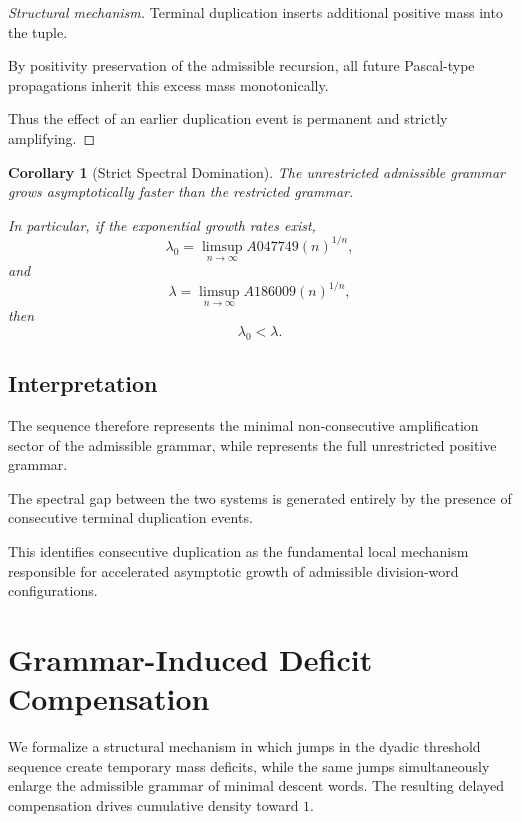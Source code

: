 \documentclass[12pt, oneside]{article}
\numberwithin{equation}{section}
\theoremstyle{definition}
\theoremstyle{plain}
\newtheorem{corollary}[theorem]{Corollary}
\theoremstyle{remark}
\begin{document}
\begin{proof}[Structural mechanism]
Terminal duplication inserts additional positive mass into the tuple.

By positivity preservation of the admissible recursion, all future
Pascal-type propagations inherit this excess mass monotonically.

Thus the effect of an earlier duplication event is permanent and
strictly amplifying.
\end{proof}

\begin{corollary}[Strict Spectral Domination]
The unrestricted admissible grammar grows asymptotically faster than the
restricted grammar.

In particular, if the exponential growth rates exist,
\[
\lambda_0
=
\limsup_{n\to\infty} A047749(n)^{1/n},
\]
and
\[
\lambda
=
\limsup_{n\to\infty} A186009(n)^{1/n},
\]
then
\[
\lambda_0 < \lambda.
\]
\end{corollary}

\subsection{Interpretation}

The sequence  therefore represents the minimal
non-consecutive amplification sector of the admissible grammar, while
 represents the full unrestricted positive grammar.

The spectral gap between the two systems is generated entirely by the
presence of consecutive terminal duplication events.

This identifies consecutive duplication as the fundamental local
mechanism responsible for accelerated asymptotic growth of admissible
division-word configurations.

\section{Grammar-Induced Deficit Compensation}
\label{sec:grammar-compensation}

We formalize a structural mechanism in which jumps in the dyadic
threshold sequence create temporary mass deficits, while the same jumps
simultaneously enlarge the admissible grammar of minimal descent words.
The resulting delayed compensation drives cumulative density toward $1$.
\end{document}
